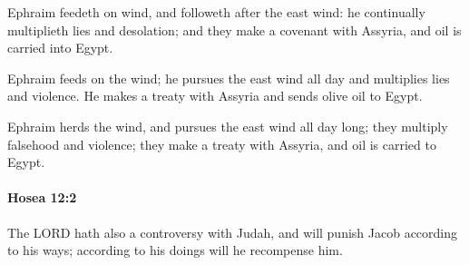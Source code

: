 			\begin{versebox}
					\item[BHS] 
					\item[LXX] 
					\item[ASV] Ephraim feedeth on wind, and followeth after the east wind: he continually multiplieth lies and desolation; and they make a covenant with Assyria, and oil is carried into Egypt.
					\item[NIV] Ephraim feeds on the wind; he pursues the east wind all day and multiplies lies and violence. He makes a treaty with Assyria and sends olive oil to Egypt.
					\item[NRSV] Ephraim herds the wind, and pursues the east wind all day long; they multiply falsehood and violence; they make a treaty with Assyria, and oil is carried to Egypt.
			\end{versebox}

		\paragraph{Hosea 12:2} %
			\label{HOSEA-12-2}

			The LORD hath also a controversy with Judah, and will punish Jacob according to his ways; according to his doings will he recompense him.

